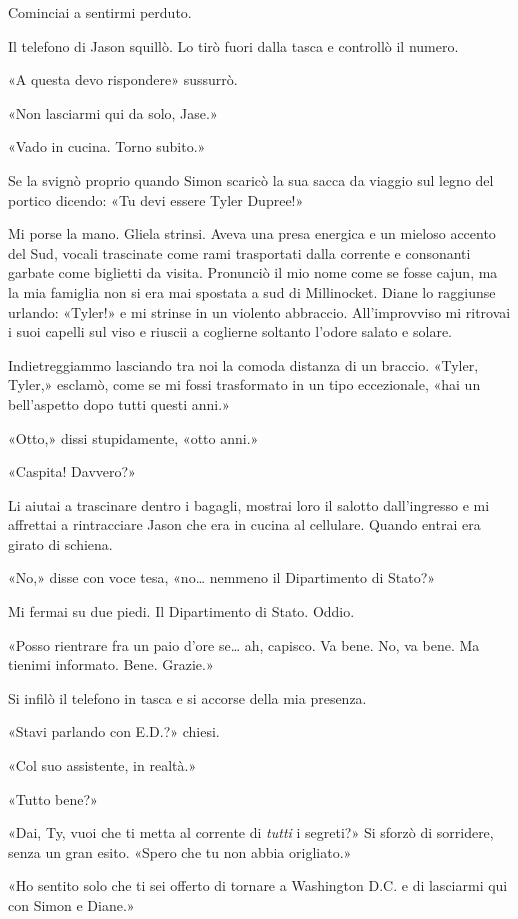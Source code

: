 Cominciai a sentirmi perduto.

Il telefono di Jason squillò. Lo tirò fuori dalla tasca e controllò il
numero.

«A questa devo rispondere» sussurrò.

«Non lasciarmi qui da solo, Jase.»

«Vado in cucina. Torno subito.»

Se la svignò proprio quando Simon scaricò la sua sacca da viaggio sul
legno del portico dicendo: «Tu devi essere Tyler Dupree!»

Mi porse la mano. Gliela strinsi. Aveva una presa energica e un mieloso
accento del Sud, vocali trascinate come rami trasportati dalla corrente
e consonanti garbate come biglietti da visita. Pronunciò il mio nome
come se fosse cajun, ma la mia famiglia non si era mai spostata a sud di
Millinocket. Diane lo raggiunse urlando: «Tyler!» e mi strinse in un
violento abbraccio. All'improvviso mi ritrovai i suoi capelli sul viso e
riuscii a coglierne soltanto l'odore salato e solare.

Indietreggiammo lasciando tra noi la comoda distanza di un braccio.
«Tyler, Tyler,» esclamò, come se mi fossi trasformato in un tipo
eccezionale, «hai un bell'aspetto dopo tutti questi anni.»

«Otto,» dissi stupidamente, «otto anni.»

«Caspita! Davvero?»

Li aiutai a trascinare dentro i bagagli, mostrai loro il salotto
dall'ingresso e mi affrettai a rintracciare Jason che era in cucina al
cellulare. Quando entrai era girato di schiena.

«No,» disse con voce tesa, «no\ldots{} nemmeno il Dipartimento di
Stato?»

Mi fermai su due piedi. Il Dipartimento di Stato. Oddio.

«Posso rientrare fra un paio d'ore se\ldots{} ah, capisco. Va bene. No,
va bene. Ma tienimi informato. Bene. Grazie.»

Si infilò il telefono in tasca e si accorse della mia presenza.

«Stavi parlando con E.D.?» chiesi.

«Col suo assistente, in realtà.»

«Tutto bene?»

«Dai, Ty, vuoi che ti metta al corrente di \emph{tutti} i segreti?» Si
sforzò di sorridere, senza un gran esito. «Spero che tu non abbia
origliato.»

«Ho sentito solo che ti sei offerto di tornare a Washington D.C. e di
lasciarmi qui con Simon e Diane.»

